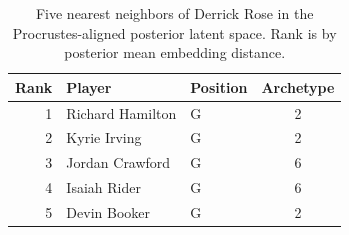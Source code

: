 \begin{table}[htbp]
  \centering\small
  \begin{tabular}{rllc}
    \toprule
    Rank & Player & Position & Archetype \\
    \midrule
    1 & Richard Hamilton & G & 2 \\
    2 & Kyrie Irving & G & 2 \\
    3 & Jordan Crawford & G & 6 \\
    4 & Isaiah Rider & G & 6 \\
    5 & Devin Booker & G & 2 \\
    \bottomrule
  \end{tabular}
  \caption{Five nearest neighbors of Derrick Rose in the Procrustes-aligned posterior latent space. Rank is by posterior mean embedding distance.}
  \label{tab:Derrick_Rose_neighbors}
\end{table}

